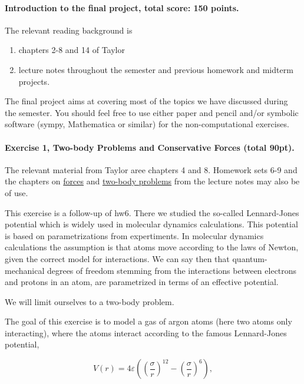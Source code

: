 \documentclass[%
oneside,                 %
final,                   %
10pt]{article}
\begin{document}
\noindent
\paragraph{Introduction to the final project, total score: 150  points.}
The relevant reading background is
\begin{enumerate}
\item chapters 2-8 and 14 of Taylor

\item lecture notes throughout the semester and previous homework and midterm projects.
\end{enumerate}

\noindent
The final project aims at covering most of the topics we have
discussed during the semester. You should feel free to use either
paper and pencil and/or symbolic software (sympy, Mathematica or
similar) for the non-computational exercises.


\paragraph{Exercise 1, Two-body Problems and Conservative Forces (total 90pt).}
The relevant material from Taylor aree chapters 4 and 8. Homework sets 6-9 and the chapters on \href{{https://mhjensen.github.io/Physics321/doc/LectureNotes/_build/html/chapter4.html}}{forces} and \href{{https://mhjensen.github.io/Physics321/doc/LectureNotes/_build/html/chapter6.html}}{two-body problems} from the lecture notes may also be of use. 

This exercise is a follow-up of hw6. There we studied the so-called
Lennard-Jones potential which is widely used in molecular dynamics
calculations. This potential is based on parametrizations from
expertiments. In molecular dynamics calculations the assumption is
that atoms move according to the laws of Newton, given the correct
model for interactions. We can say then that quantum-mechanical
degrees of freedom stemming from the interactions between electrons
and protons in an atom, are parametrized in terms of an effective
potential.

We will limit ourselves to a two-body problem.

The goal of this exercise is to model a gas of argon atoms (here two
atoms only interacting), where the atoms interact according to the
famous Lennard-Jones potential,

\begin{equation}
    V(r) = 4\varepsilon\left((\frac{\sigma}{r})^{12} - (\frac{\sigma}{r})^6\right), \label{eq:lj}
\end{equation}
\end{document}
